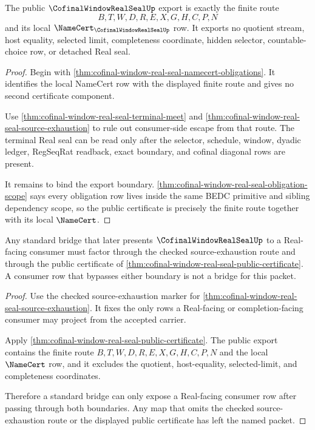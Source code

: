\begin{theorem}
\label{thm:cofinal-window-real-seal-public-certificate}
The public $\CofinalWindowRealSealUp$ export is exactly the finite route
$$
B,T,W,D,R,E,X,G,H,C,P,N
$$
and its local $\NameCert_{\CofinalWindowRealSealUp}$ row. It exports no quotient stream, host equality, selected limit, completeness coordinate, hidden selector, countable-choice row, or detached Real seal.
\end{theorem}
\begin{proof}
Begin with \autoref{thm:cofinal-window-real-seal-namecert-obligations}. It identifies the local NameCert row with the displayed finite route and gives no second certificate component.

Use \autoref{thm:cofinal-window-real-seal-terminal-meet} and \autoref{thm:cofinal-window-real-seal-source-exhaustion} to rule out consumer-side escape from that route. The terminal Real seal can be read only after the selector, schedule, window, dyadic ledger, RegSeqRat readback, exact boundary, and cofinal diagonal rows are present.

It remains to bind the export boundary. \autoref{thm:cofinal-window-real-seal-obligation-scope} says every obligation row lives inside the same BEDC primitive and sibling dependency scope, so the public certificate is precisely the finite route together with its local $\NameCert$.
\end{proof}

\begin{theorem}
\label{thm:cofinal-window-real-seal-bridge-boundary}
Any standard bridge that later presents $\CofinalWindowRealSealUp$ to a Real-facing consumer must factor through the checked source-exhaustion route and through the public certificate of \autoref{thm:cofinal-window-real-seal-public-certificate}. A consumer row that bypasses either boundary is not a bridge for this packet.
\end{theorem}
\begin{proof}
Use the checked source-exhaustion marker for \autoref{thm:cofinal-window-real-seal-source-exhaustion}. It fixes the only rows a Real-facing or completion-facing consumer may project from the accepted carrier.

Apply \autoref{thm:cofinal-window-real-seal-public-certificate}. The public export contains the finite route $B,T,W,D,R,E,X,G,H,C,P,N$ and the local $\NameCert$ row, and it excludes the quotient, host-equality, selected-limit, and completeness coordinates.

Therefore a standard bridge can only expose a Real-facing consumer row after passing through both boundaries. Any map that omits the checked source-exhaustion route or the displayed public certificate has left the named packet.
\end{proof}

